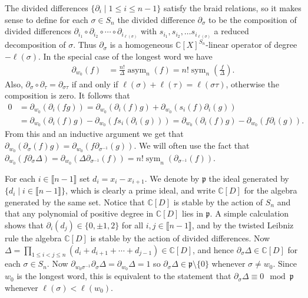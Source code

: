 \documentclass[11pt,fleqn]{article}
\newcommand\CC{\mathbb C}
\newcommand\p{\mathfrak p}
\newcommand\interval[1]{\llbracket #1 \rrbracket}
\DeclareMathOperator\sym{sym}
\DeclareMathOperator\asym{asym}
\begin{document}
The divided differences $\{\partial_{i} \mid 1 \leq i \leq n-1\}$ satisfy the 
braid relations, so it makes sense to define for each $\sigma \in S_n$ the 
divided difference $\partial_\sigma$ to be the composition of 
divided differences $\partial_{i_1} \circ \partial_{i_2} \circ \cdots \circ 
\partial_{i_{\ell(\sigma)}}$ with $s_{i_1}, s_{i_2}, \ldots 
s_{i_{\ell(\sigma)}}$ a reduced decomposition of $\sigma$. Thus 
$\partial_\sigma$ is a homogeneous $\CC[X]^{S_n}$-linear
operator of degree $-\ell(\sigma)$. In the special case of the longest word 
we have  
\begin{align*}
\partial_{w_0}(f) &= \frac{n!}{\Delta} \asym_n(f) 
  = n! \sym_n \left( \frac{f}{\Delta}\right).
\end{align*}
Also, $\partial_{\sigma} \circ \partial_{\tau} = \partial_{\sigma \tau}$ if and
only if $\ell(\sigma) + \ell(\tau) = \ell(\sigma\tau)$, otherwise the 
composition is zero. It follows that
\begin{align*}
0 
  &= \partial_{w_0}(\partial_{i}(fg)) 
  = \partial_{w_0}(\partial_{i}(f)g)  + 
      \partial_{w_0}(s_i(f) \partial_{i}(g)) \\
  &= \partial_{w_0}(\partial_{i}(f)g) -
      \partial_{w_0}(f s_i(\partial_{i}(g))) 
  = \partial_{w_0}(\partial_{i}(f)g) -
      \partial_{w_0}(f \partial_{i}(g)).
\end{align*}
From this and an inductive argument we get that 
$\partial_{w_0}(\partial_\sigma(f) g) = \partial_{w_0}(f 
\partial_{\sigma^{-1}}(g))$. We will often use the fact that
$\partial_{w_0}(f \partial_\sigma \Delta) = \partial_{w_0} (\Delta 
\partial_{\sigma^{-1}} (f)) = n!\sym_n(\partial_{\sigma^{-1}}(f))$.

For each $i \in \interval{n-1}$ set $d_i = x_i - x_{i+1}$. We denote by 
$\p$ the ideal generated by $\{d_i \mid i \in \interval{n-1}\}$, which is 
clearly a prime ideal, and write $\CC[D]$ for the algebra generated by the 
same set. Notice that $\CC[D]$ is stable by the action of $S_n$ and that any 
polynomial of positive degree in $\CC[D]$ lies in $\p$. A simple calculation 
shows that $\partial_i(d_j) \in \{0,\pm 1,2\}$ for all $i,j \in 
\interval{n-1}$, and by the twisted Leibniz rule the algebra $\CC[D]$ is 
stable by the action of divided differences. Now $\Delta = \prod_{1 \leq i < j 
\leq n}(d_i + d_{i+1} + \cdots + d_{j-1}) \in \CC[D]$, and hence 
$\partial_\sigma \Delta \in \CC[D]$ for each $\sigma \in S_n$. Now
$\partial_{w_0 \sigma^{-1}} \partial_\sigma \Delta = \partial_{w_0} \Delta = 1$
so $\partial_\sigma \Delta \in \p \setminus \{0\}$ whenever $\sigma 
\neq w_0$. Since $w_0$ is the longest word, this is equivalent to the statement
that $\partial_\sigma \Delta \equiv 0 \mod \p$ whenever $\ell(\sigma) < 
\ell(w_0)$.
\end{document}
